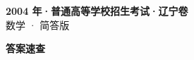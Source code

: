 \documentclass[zihao=-4, a4paper]{ctexart}
\begin{document}
\begin{center}
  {\Large\bfseries 2004 年·普通高等学校招生考试·辽宁卷}\\[4pt]
  {\large 数学 · 简答版}
\end{center}
\medskip
{}

\clearpage
{}
\begin{center}{\Large\bfseries 答案速查}\end{center}
\medskip

\end{document}
